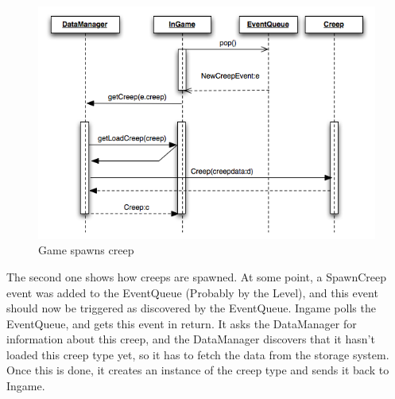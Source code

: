 \begin{figure}[H]
	\begin{center}
		\includegraphics[scale=0.75]{graphics/GameSpawnsCreep}
	\end{center}
        \caption{Game spawns creep}
\end{figure}

The second one shows how creeps are spawned. At some point, a SpawnCreep event
was added to the EventQueue (Probably by the Level), and this event should now
be triggered as discovered by the EventQueue. Ingame polls the EventQueue,
and gets this event in return. It asks the DataManager for information about this
creep, and the DataManager discovers that it hasn't loaded this creep type yet, so
it has to fetch the data from the storage system. Once this is done, it
creates an instance of the creep type and sends it back to Ingame.

